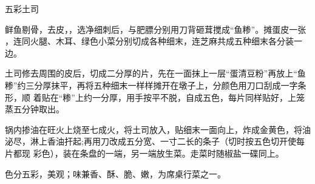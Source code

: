 \begin{recipe}{五彩土司}

\ingredients


\cooking

\step 鲜鱼剔骨，去皮，，选净细刺后，与肥膘分别用刀背砸茸搅成“鱼糁”。摊蛋皮一张
，连同火腿、木耳、绿色小菜分别切成各种细末，连芝麻共成五种细末各分装一边。

\step 土司修去周围的皮后，切成二分厚的片，先在一面抹上一层“蛋清豆粉”再放上“鱼
糁”约三分厚抹平，再将五种细末一样样摊开在墩子上，分颜色用刀口刮成一字条形，顺
着贴在“糁”上约一分厚，用手按平不脱，自成五色，每片同样贴好，上笼蒸五分钟取出。

\step 锅内掺油在旺火上烧至七成火，将土司放入，贴细末一面向上，炸成金黄色，将油
泌尽，淋上香油扞起;再用刀改成五分宽、一寸二长的条子（切时按五色切开使每片都现
彩色），装在条盘的一端，另一端放生菜。走菜时随椒盐一碟同上。

\notes

色分五彩，美观；味兼香、酥、脆、嫩，为席桌行菜之一。

\end{recipe}

